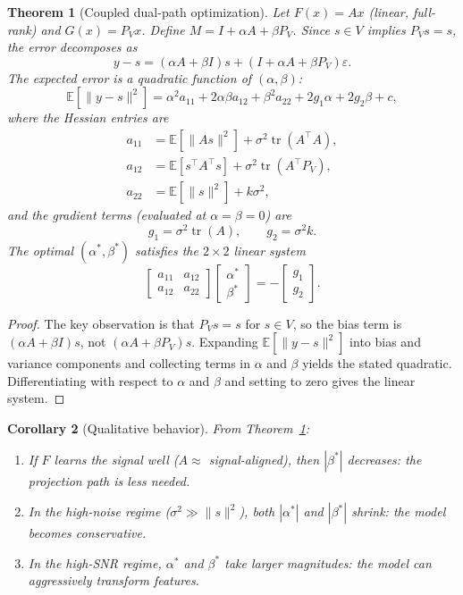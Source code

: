 \documentclass[11pt,a4paper]{article}
\newtheorem{theorem}{Theorem}[section]
\newtheorem{corollary}[theorem]{Corollary}
\theoremstyle{definition}
\DeclareMathOperator{\tr}{tr}
\begin{document}
\begin{theorem}[Coupled dual-path optimization]
\label{thm:coupled}
Let $F(x) = Ax$ (linear, full-rank) and $G(x) = P_V x$. Define
$M = I + \alpha A + \beta P_V$. Since $s \in V$ implies $P_V s = s$,
the error decomposes as
\[
  y - s = (\alpha A + \beta I)s + (I + \alpha A + \beta P_V)\varepsilon.
\]
The expected error is a quadratic function of $(\alpha, \beta)$:
\[
  \mathbb{E}[\|y - s\|^2]
  = \alpha^2 a_{11} + 2\alpha\beta a_{12} + \beta^2 a_{22}
  + 2 g_1 \alpha + 2 g_2 \beta + c,
\]
where the Hessian entries are
\begin{align*}
  a_{11} &= \mathbb{E}[\|As\|^2] + \sigma^2 \tr(A^\top A), \\
  a_{12} &= \mathbb{E}[s^\top A^\top s] + \sigma^2 \tr(A^\top P_V), \\
  a_{22} &= \mathbb{E}[\|s\|^2] + k\sigma^2,
\end{align*}
and the gradient terms (evaluated at $\alpha = \beta = 0$) are
\[
  g_1 = \sigma^2 \tr(A), \qquad g_2 = \sigma^2 k.
\]
The optimal $(\alpha^*, \beta^*)$ satisfies the $2 \times 2$ linear system
\[
  \begin{bmatrix} a_{11} & a_{12} \\ a_{12} & a_{22} \end{bmatrix}
  \begin{bmatrix} \alpha^* \\ \beta^* \end{bmatrix}
  = -\begin{bmatrix} g_1 \\ g_2 \end{bmatrix}.
\]
\end{theorem}

\begin{proof}
The key observation is that $P_V s = s$ for $s \in V$, so the bias
term is $(\alpha A + \beta I)s$, not $(\alpha A + \beta P_V)s$.
Expanding $\mathbb{E}[\|y - s\|^2]$ into bias and variance components
and collecting terms in $\alpha$ and $\beta$ yields the stated quadratic.
Differentiating with respect to $\alpha$ and $\beta$ and setting to zero
gives the linear system.
\end{proof}

\begin{corollary}[Qualitative behavior]
\label{cor:qualitative}
From Theorem~\ref{thm:coupled}:
\begin{enumerate}[nosep]
  \item If $F$ learns the signal well ($A \approx$ signal-aligned), then
        $|\beta^*|$ decreases: the projection path is less needed.
  \item In the high-noise regime ($\sigma^2 \gg \|s\|^2$), both $|\alpha^*|$
        and $|\beta^*|$ shrink: the model becomes conservative.
  \item In the high-SNR regime, $\alpha^*$ and $\beta^*$ take larger magnitudes:
        the model can aggressively transform features.
\end{enumerate}
\end{corollary}
\end{document}
